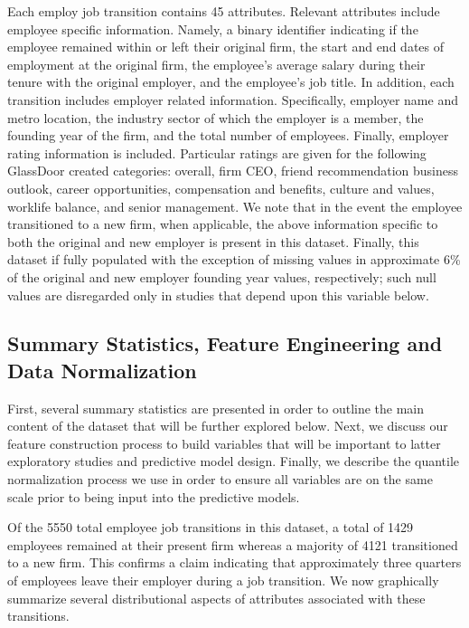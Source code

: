 \documentclass[10pt]{article}
\begin{document}
Each employ job transition contains 45 attributes.  Relevant attributes 
include employee specific information. Namely, a binary identifier 
indicating if the employee remained within or left their original firm,
the start and end dates of employment at the original firm, the 
employee's average salary during their tenure with the original employer, 
and the employee's job title. 
In addition, each transition includes employer related information. 
Specifically, employer name and metro location, the industry sector of which the employer 
is a member, the founding year of the firm, and the total number of employees. 
Finally, employer rating information is included.  Particular ratings are 
given for the following GlassDoor created categories: overall, firm CEO, friend recommendation 
business outlook, career opportunities, compensation and benefits, culture and values, 
worklife balance, and senior management. 
We note that in the event the employee transitioned to a new firm, when applicable,
the above information specific to both the original and new employer is present in this dataset. 
Finally, this dataset if fully populated with the exception of missing values in 
approximate 6\% of the original and new employer founding year values, respectively;
such null values are disregarded 
only in studies that depend upon this variable below.

\subsection{Summary Statistics, Feature Engineering and Data Normalization}

First, several summary statistics are presented in order to outline 
the main content of the dataset that will be further explored below.
Next, we discuss our feature construction process to build variables 
that will be important to latter exploratory studies and predictive 
model design.  Finally, we describe the quantile normalization process 
we use in order to ensure all variables are on the same scale prior 
to being input into the predictive models.

Of the 5550 total employee job transitions in this dataset, 
a total of 1429 employees remained at their present firm whereas a majority of 4121 
transitioned to a new firm.  This confirms a claim \cite{Smart2016} indicating 
that approximately three quarters of employees leave their employer during a job 
transition.  We now graphically summarize several distributional aspects of 
attributes associated with these transitions.
\end{document}
